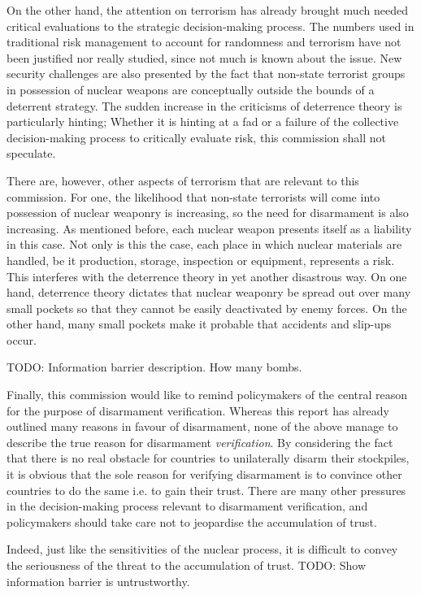 \documentclass[twoside,titlepage,11pt,twocolumn,a4paper]{article}
\begin{document}
On the other hand, the attention on terrorism has already brought much
needed critical evaluations to the strategic decision-making
process. The numbers used in traditional risk management to account
for randomness and terrorism have not been justified nor really
studied, since not much is known about the issue. New security
challenges are also presented by the fact that non-state terrorist
groups in possession of nuclear weapons are conceptually outside the
bounds of a deterrent strategy. The sudden increase in the criticisms
of deterrence theory is particularly hinting; Whether it is hinting at
a fad or a failure of the collective decision-making process to
critically evaluate risk, this commission shall not speculate.

There are, however, other aspects of terrorism that are relevant to
this commission. For one, the likelihood that non-state terrorists
will come into possession of nuclear weaponry is increasing, so the
need for disarmament is also increasing. As mentioned before, each
nuclear weapon presents itself as a liability in this case. Not only
is this the case, each place in which nuclear materials are handled,
be it production, storage, inspection or equipment, represents a
risk. This interferes with the deterrence theory in yet another
disastrous way. On one hand, deterrence theory dictates that nuclear
weaponry be spread out over many small pockets so that they cannot be
easily deactivated by enemy forces. On the other hand, many small
pockets make it probable that accidents and slip-ups occur.

TODO: Information barrier description. How many bombs.

Finally, this commission would like to remind policymakers of the
central reason for the purpose of disarmament verification. Whereas
this report has already outlined many reasons in favour of
disarmament, none of the above manage to describe the true reason for
disarmament \emph{verification}. By considering the fact that there is
no real obstacle for countries to unilaterally disarm their
stockpiles, it is obvious that the sole reason for verifying
disarmament is to convince other countries to do the same i.e. to gain
their trust. There are many other pressures in the decision-making
process relevant to disarmament verification, and policymakers should
take care not to jeopardise the accumulation of trust.

Indeed, just like the sensitivities of the nuclear process, it is
difficult to convey the seriousness of the threat to the accumulation
of trust. TODO: Show information barrier is untrustworthy.
\end{document}
